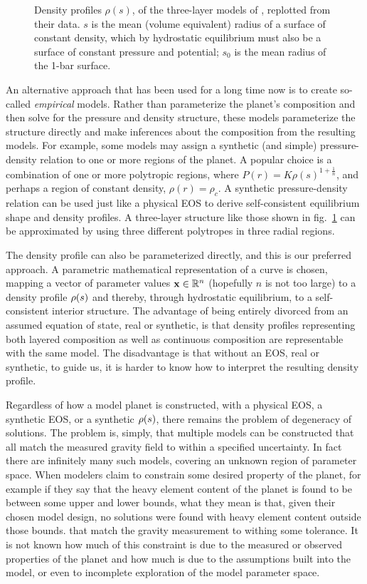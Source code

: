 \begin{figure}[tb!]
\centering
{}
\caption{Density profiles $\rho(s)$, of the three-layer models of 
\citet{Nettelmann2013b}, replotted from their data. $s$ is the mean (volume
equivalent) radius of a surface of constant density, which by hydrostatic
equilibrium must also be a surface of constant pressure and potential; $s_0$ is
the mean radius of the 1-bar surface.}
\label{fig:N13_profs}
\end{figure}

An alternative approach that has been used for a long time now is to create
so-called \emph{empirical} models. Rather than parameterize the planet's
composition and then solve for the pressure and density structure, these models
parameterize the structure directly and make inferences about the composition
from the resulting models. For example, some models may assign a synthetic (and
simple) pressure-density relation to one or more regions of the planet. A
popular choice is a combination of one or more polytropic regions, where
$P(r)=K\rho(s)^{1+\frac{1}{n}}$, and perhaps a region of constant density,
$\rho(r)=\rho_c$. A synthetic pressure-density relation can be used just like a
physical EOS to derive self-consistent equilibrium shape and density profiles. A
three-layer structure like those shown in fig.~\ref{fig:N13_profs} can be
approximated by using three different polytropes in three radial regions.

The density profile can also be parameterized directly, and this is our
preferred approach. A parametric mathematical representation of a curve is
chosen, mapping a vector of parameter values $\mathbf{x}\in{\mathbb{R}^n}$ (hopefully
$n$ is not too large) to a density profile $\rho(s)$ and thereby, through
hydrostatic equilibrium, to a self-consistent interior structure. The advantage
of being entirely divorced from an assumed equation of state, real or synthetic,
is that density profiles representing both layered composition as well as
continuous composition are representable with the same model. The disadvantage
is that without an EOS, real or synthetic, to guide us, it is harder to know how
to interpret the resulting density profile.

Regardless of how a model planet is constructed, with a physical EOS, a
synthetic EOS, or a synthetic $\rho(s)$, there remains the problem of degeneracy
of solutions. The problem is, simply, that multiple models can be constructed
that all match the measured gravity field to within a specified uncertainty. In
fact there are infinitely many such models, covering an unknown region of
parameter space. When modelers claim to constrain some desired property of the
planet, for example if they say that the heavy element content of the planet is
found to be between some upper and lower bounds, what they mean is that, given
their chosen model design, no solutions were found with heavy element content
outside those bounds. that match the gravity measurement to withing some
tolerance. It is not known how much of this constraint is due to the measured or
observed properties of the planet and how much is due to the assumptions built
into the model, or even to incomplete exploration of the model parameter space.

